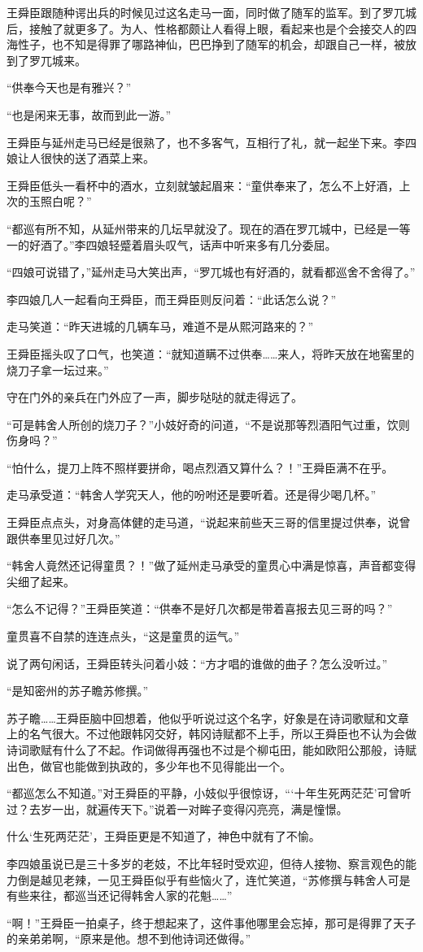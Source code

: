 王舜臣跟随种谔出兵的时候见过这名走马一面，同时做了随军的监军。到了罗兀城后，接触了就更多了。为人、性格都颇让人看得上眼，看起来也是个会接交人的四海性子，也不知是得罪了哪路神仙，巴巴挣到了随军的机会，却跟自己一样，被放到了罗兀城来。

“供奉今天也是有雅兴？”

“也是闲来无事，故而到此一游。”

王舜臣与延州走马已经是很熟了，也不多客气，互相行了礼，就一起坐下来。李四娘让人很快的送了酒菜上来。

王舜臣低头一看杯中的酒水，立刻就皱起眉来：“童供奉来了，怎么不上好酒，上次的玉照白呢？”

“都巡有所不知，从延州带来的几坛早就没了。现在的酒在罗兀城中，已经是一等一的好酒了。”李四娘轻蹙着眉头叹气，话声中听来多有几分委屈。

“四娘可说错了，”延州走马大笑出声，“罗兀城也有好酒的，就看都巡舍不舍得了。”

李四娘几人一起看向王舜臣，而王舜臣则反问着：“此话怎么说？”

走马笑道：“昨天进城的几辆车马，难道不是从熙河路来的？”

王舜臣摇头叹了口气，也笑道：“就知道瞒不过供奉……来人，将昨天放在地窖里的烧刀子拿一坛过来。”

守在门外的亲兵在门外应了一声，脚步哒哒的就走得远了。

“可是韩舍人所创的烧刀子？”小妓好奇的问道，“不是说那等烈酒阳气过重，饮则伤身吗？”

“怕什么，提刀上阵不照样要拼命，喝点烈酒又算什么？！”王舜臣满不在乎。

走马承受道：“韩舍人学究天人，他的吩咐还是要听着。还是得少喝几杯。”

王舜臣点点头，对身高体健的走马道，“说起来前些天三哥的信里提过供奉，说曾跟供奉里见过好几次。”

“韩舍人竟然还记得童贯？！”做了延州走马承受的童贯心中满是惊喜，声音都变得尖细了起来。

“怎么不记得？”王舜臣笑道：“供奉不是好几次都是带着喜报去见三哥的吗？”

童贯喜不自禁的连连点头，“这是童贯的运气。”

说了两句闲话，王舜臣转头问着小妓：“方才唱的谁做的曲子？怎么没听过。”

“是知密州的苏子瞻苏修撰。”

苏子瞻……王舜臣脑中回想着，他似乎听说过这个名字，好象是在诗词歌赋和文章上的名气很大。不过他跟韩冈交好，韩冈诗赋都不上手，所以王舜臣也不认为会做诗词歌赋有什么了不起。作词做得再强也不过是个柳屯田，能如欧阳公那般，诗赋出色，做官也能做到执政的，多少年也不见得能出一个。

“都巡怎么不知道。”对王舜臣的平静，小妓似乎很惊讶，“‘十年生死两茫茫’可曾听过？去岁一出，就遍传天下。”说着一对眸子变得闪亮亮，满是憧憬。

什么‘生死两茫茫’，王舜臣更是不知道了，神色中就有了不愉。

李四娘虽说已是三十多岁的老妓，不比年轻时受欢迎，但待人接物、察言观色的能力倒是越见老辣，一见王舜臣似乎有些恼火了，连忙笑道，“苏修撰与韩舍人可是有些来往，都巡当还记得韩舍人家的花魁……”

“啊！”王舜臣一拍桌子，终于想起来了，这件事他哪里会忘掉，那可是得罪了天子的亲弟弟啊，“原来是他。想不到他诗词还做得。”


